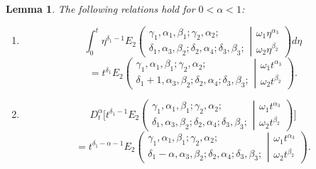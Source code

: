 \documentclass[10pt,a4paper]{amsart}
\newtheorem{lem}{Lemma}
\begin{document}
\begin{lem}
The following relations hold for $0<\alpha<1$:
\begin{enumerate}
    \item   \[
    \int_0^t \eta^{\delta_1-1 }E_2\left( \begin{array}{c}\gamma_1,\alpha_1, \beta_1 ; \gamma_2, \alpha_2 ; \\\delta_1, \alpha_3, \beta_2 ;\delta_2, \alpha_4; \delta_3, \beta_3 ; \end{array} \left| \begin{array}{c}\omega_1 \eta^{\alpha_3} \\\omega_2 \eta^{\beta_2} \end{array} \right.\right) d\eta
    \]
    \begin{equation} \label{jumaeva:eq:8}
    =t^{\delta_1} E_2\left( \begin{array}{c}\gamma_1,\alpha_1, \beta_1 ; \gamma_2, \alpha_2 ; \\\delta_1+1, \alpha_3, \beta_2 ;\delta_2, \alpha_4; \delta_3, \beta_3 ; \end{array} \left| \begin{array}{c}\omega_1 t^{\alpha_3} \\\omega_2 t^{\beta_2}\end{array}\right.\right).\end{equation}
    \item  
    \begin{equation*}
    D_t^\alpha\bigg[t^{\delta_1-1 }E_2\left(\begin{array}{c}\gamma_1,\alpha_1, \beta_1 ; \gamma_2, \alpha_2 ; \\\delta_1, \alpha_3, \beta_2 ;\delta_2, \alpha_4; \delta_3, \beta_3 ; \end{array} \left| \begin{array}{c}\omega_1 t^{\alpha_3} \\\omega_2 t^{\beta_2} \end{array} \right.\right)\bigg]
    \end{equation*}
    \begin{equation}\label{jumaeva:eq:9}
    =t^{\delta_1-\alpha-1} E_2\left( \begin{array}{c}\gamma_1,\alpha_1, \beta_1 ; \gamma_2, \alpha_2 ; \\\delta_1-\alpha, \alpha_3, \beta_2 ;\delta_2, \alpha_4; \delta_3, \beta_3 ; \end{array} \left|\begin{array}{c}\omega_1 t^{\alpha_3} \\\omega_2 t^{\beta_2} \end{array}\right.\right).

\end{equation}
\end{enumerate}
\end{lem}
\end{document}
